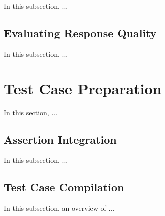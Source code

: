 In this subsection, ...

\vspace{0.1 cm}
\subsection{Evaluating Response Quality}
\label{sec:evaluating_response}
\vspace{0.1 cm}

In this subsection, ...

\section{Test Case Preparation}
\label{sec:test_case_preparation}
\vspace{0.2 cm}

In this section, ...

\vspace{0.1 cm}
\subsection{Assertion Integration}
\label{sec:assertion_integration}
\vspace{0.1 cm}

In this subsection, ...

\vspace{0.1 cm}
\subsection{Test Case Compilation}
\label{sec:test_compilation}
\vspace{0.1 cm}

In this subsection, an overview of ...